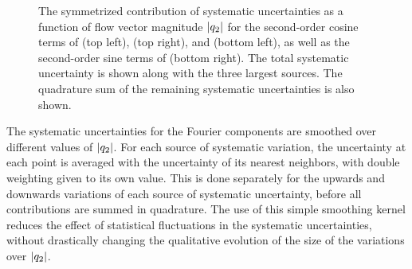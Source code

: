 \begin{figure}[t]
\caption{The symmetrized contribution of systematic uncertainties as a function of flow vector magnitude $|q_{2}|$ for the second-order cosine terms of \Rout (top left), \Rside (top right), and \Rlong (bottom left), as well as the second-order sine terms of \Ros (bottom right). The total systematic uncertainty is shown along with the three largest sources. The quadrature sum of the remaining systematic uncertainties is also shown.}
\label{fig:azi_syst_breakdown}
\end{figure}

The systematic uncertainties for the Fourier components are smoothed over different values of $|q_{2}|$. For each source of systematic variation, the uncertainty at each point is averaged with the uncertainty of its nearest neighbors, with double weighting given to its own value. This is done separately for the upwards and downwards variations of each source of systematic uncertainty, before all contributions are summed in quadrature. The use of this simple smoothing kernel reduces the effect of statistical fluctuations in the systematic uncertainties, without drastically changing the qualitative evolution of the size of the variations over $|q_{2}|$.
